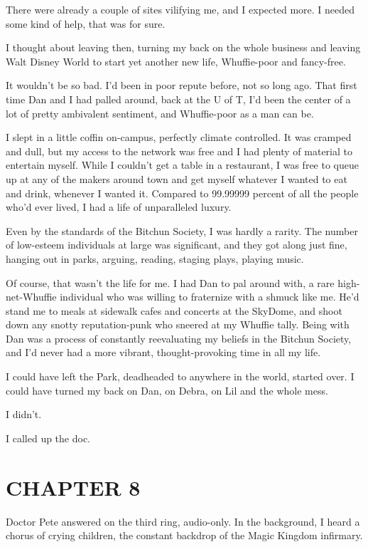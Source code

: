 There were already a couple of sites vilifying me, and I expected
more. I needed some kind of help, that was for sure.

I thought about leaving then, turning my back on the whole business
and leaving Walt Disney World to start yet another new life,
Whuffie-poor and fancy-free.

It wouldn't be so bad. I'd been in poor repute before, not so long
ago. That first time Dan and I had palled around, back at the U of
T, I'd been the center of a lot of pretty ambivalent sentiment, and
Whuffie-poor as a man can be.

I slept in a little coffin on-campus, perfectly climate controlled.
It was cramped and dull, but my access to the network was free and
I had plenty of material to entertain myself. While I couldn't get
a table in a restaurant, I was free to queue up at any of the
makers around town and get myself whatever I wanted to eat and
drink, whenever I wanted it. Compared to 99.99999 percent of all
the people who'd ever lived, I had a life of unparalleled luxury.

Even by the standards of the Bitchun Society, I was hardly a
rarity. The number of low-esteem individuals at large was
significant, and they got along just fine, hanging out in parks,
arguing, reading, staging plays, playing music.

Of course, that wasn't the life for me. I had Dan to pal around
with, a rare high-net-Whuffie individual who was willing to
fraternize with a shmuck like me. He'd stand me to meals at
sidewalk cafes and concerts at the SkyDome, and shoot down any
snotty reputation-punk who sneered at my Whuffie tally. Being with
Dan was a process of constantly reevaluating my beliefs in the
Bitchun Society, and I'd never had a more vibrant,
thought-provoking time in all my life.

I could have left the Park, deadheaded to anywhere in the world,
started over. I could have turned my back on Dan, on Debra, on Lil
and the whole mess.

I didn't.

I called up the doc.

\section{CHAPTER 8}

Doctor Pete answered on the third ring, audio-only. In the
background, I heard a chorus of crying children, the constant
backdrop of the Magic Kingdom infirmary.

